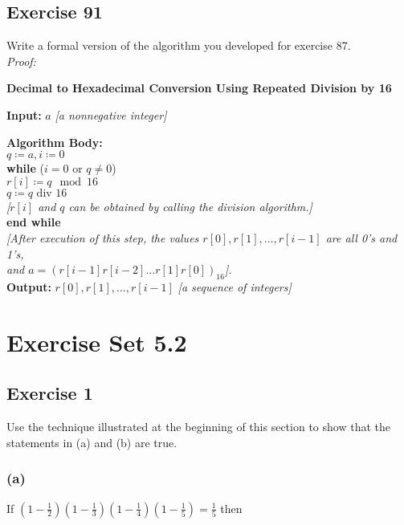 \documentclass[14pt]{extarticle}
\newcommand{\dps}{\displaystyle}
\newcommand{\cy}{\color{cyan}}
\begin{document}
\subsection{Exercise 91}
Write a formal version of the algorithm you developed for exercise 87.\\
{\it Proof:}
\begin{tcolorbox}[colframe=cyan]
    {\bf \cy Decimal to Hexadecimal Conversion Using Repeated Division by 16}

    {\bf \cy Input:} $a$ {\it[a nonnegative integer]}

    \begin{tabbing}
        {\bf\cy Alg}\={\bf\cy orithm Body:} \\
        \> $q \coloneqq a, i \coloneqq 0$ \\
        \> {\bf wh}\={\bf ile} ($i = 0$ or $q \neq 0$) \\
        \>          \> $r[i] \coloneqq q \mod 16$ \\
        \>          \> $q \coloneqq q \text{ div } 16$ \\
        \>          \> {\it [$r[i]$ and $q$ can be obtained by calling the division algorithm.]} \\
        \> {\bf end while} \\
        \> {\it [After execution of this step, the values $r[0], r[1], \ldots, r[i-1]$ are all 0's and 1's,} \\
        \> {\it and $a = (r[i-1] r[i-2] \ldots r[1] r[0])_{16}$].} \\
        {\bf\cy Output:} $r[0], r[1], \ldots, r[i-1] $ {\it [a sequence of integers]}
    \end{tabbing}
\end{tcolorbox}

\section{Exercise Set 5.2}

\subsection{Exercise 1}
Use the technique illustrated at the beginning of this section to show that the statements in (a) and (b) are true.

\subsubsection{(a)}
If $\dps \left(1 - \frac{1}{2}\right)\left(1 - \frac{1}{3}\right)\left(1 - \frac{1}{4}\right)\left(1 - \frac{1}{5}\right) = \frac{1}{5}$ then
\end{document}

